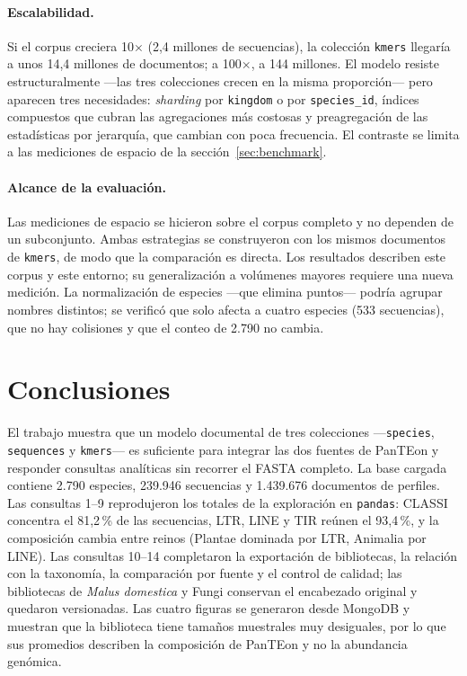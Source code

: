 \documentclass[journal]{IEEEtran}
\begin{document}
\paragraph*{Escalabilidad.}
Si el corpus creciera 10$\times$ (2,4 millones de secuencias), la colección \texttt{kmers}
llegaría a unos 14,4 millones de documentos; a 100$\times$, a 144 millones. El modelo
resiste estructuralmente ---las tres colecciones crecen en la misma proporción--- pero
aparecen tres necesidades: \textit{sharding} por \texttt{kingdom} o por \texttt{species\_id},
índices compuestos que cubran las agregaciones más costosas y preagregación de las
estadísticas por jerarquía, que cambian con poca frecuencia. El contraste se limita a las
mediciones de espacio de la sección~\ref{sec:benchmark}.

\paragraph*{Alcance de la evaluación.}
Las mediciones de espacio se hicieron sobre el corpus completo y no dependen de un
subconjunto. Ambas estrategias se construyeron con los mismos documentos de \texttt{kmers},
de modo que la comparación es directa. Los resultados describen este corpus y este entorno;
su generalización a volúmenes mayores requiere una nueva medición. La normalización de
especies ---que elimina puntos--- podría agrupar nombres distintos; se verificó que solo
afecta a cuatro especies (533 secuencias), que no hay colisiones y que el conteo de 2.790 no
cambia.

\section{Conclusiones}
El trabajo muestra que un modelo documental de tres colecciones ---\texttt{species},
\texttt{sequences} y \texttt{kmers}--- es suficiente para integrar las dos fuentes de
PanTEon y responder consultas analíticas sin recorrer el FASTA completo. La base cargada
contiene 2.790 especies, 239.946 secuencias y 1.439.676 documentos de perfiles. Las
consultas 1--9 reprodujeron los totales de la exploración en \texttt{pandas}: CLASSI
concentra el 81,2\,\% de las secuencias, LTR, LINE y TIR reúnen el 93,4\,\%, y la
composición cambia entre reinos (Plantae dominada por LTR, Animalia por LINE). Las consultas
10--14 completaron la exportación de bibliotecas, la relación con la taxonomía, la
comparación por fuente y el control de calidad; las bibliotecas de \textit{Malus domestica}
y Fungi conservan el encabezado original y quedaron versionadas. Las cuatro figuras se
generaron desde MongoDB y muestran que la biblioteca tiene tamaños muestrales muy
desiguales, por lo que sus promedios describen la composición de PanTEon y no la abundancia
genómica.
\end{document}
